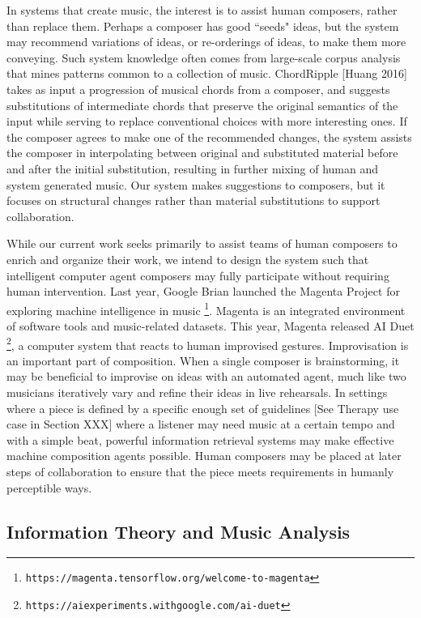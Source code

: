 \documentclass[final,authoryear,5p,times,twocolumn]{elsarticle}
\begin{document}
In systems that create music, the interest is to assist human composers, rather than replace them. Perhaps a composer has good ``seeds" ideas, but the system may recommend variations of ideas, or re-orderings of ideas, to make them more conveying. Such system knowledge often comes from large-scale corpus analysis that mines patterns common to a collection of music. ChordRipple [Huang 2016] takes as input a progression of musical chords from a composer, and suggests substitutions of intermediate chords that preserve the original semantics of the input while serving to replace conventional choices with more interesting ones. If the composer agrees to make one of the recommended changes, the system assists the composer in interpolating between original and substituted material before and after the initial substitution, resulting in further mixing of human and system generated music. Our system makes suggestions to composers, but it focuses on structural changes rather than material substitutions to support collaboration.

While our current work seeks primarily to assist teams of human composers to enrich and organize their work, we intend to design the system such that intelligent computer agent composers may fully participate without requiring human intervention. Last year, Google Brian launched the Magenta Project for exploring machine intelligence in music \footnote{\texttt{https://magenta.tensorflow.org/welcome-to-magenta}}. Magenta is an integrated environment of software tools and music-related datasets. This year, Magenta released AI Duet \footnote{\texttt{https://aiexperiments.withgoogle.com/ai-duet}}, a computer system that reacts to human improvised gestures. Improvisation is an important part of composition. When a single composer is brainstorming, it may be beneficial to improvise on ideas with an automated agent, much like two musicians iteratively vary and refine their ideas in live rehearsals. In settings where a piece is defined by a specific enough set of guidelines [See Therapy use case in Section XXX]  where a listener may need music at a certain tempo and with a simple beat, powerful information retrieval systems may make effective machine composition agents possible. Human composers may be placed at later steps of collaboration to ensure that the piece meets requirements in humanly perceptible ways.

\subsection{Information Theory and Music Analysis}
\end{document}
